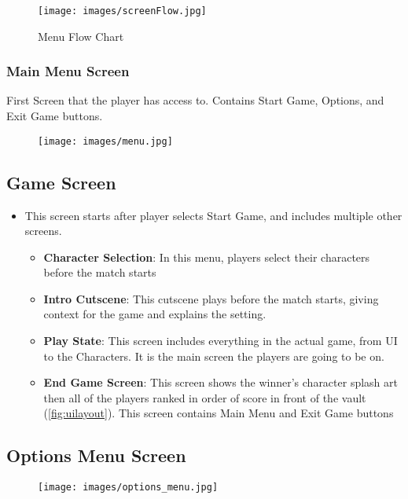 \documentclass[10pt]{report}
\begin{document}
\begin{figure}[H]
    \centering
    \texttt{[image: images/screenFlow.jpg]}
    \caption{Menu Flow Chart}
\end{figure}

\subsubsection{Main Menu Screen}

First Screen that the player has access to. Contains Start Game, Options, and Exit Game buttons.

\begin{figure}[H]
    \centering
    \texttt{[image: images/menu.jpg]}
    \caption{}
\end{figure}

\subsection{Game Screen}

\begin{itemize}
    \item This screen starts after player selects Start Game, and includes multiple other screens.
    \begin{itemize}    
        \item \textbf{Character Selection}: In this menu, players select their characters before the match starts
        \item \textbf{Intro Cutscene}: This cutscene plays before the match starts, giving context for the game and explains the setting.
        \item \textbf{Play State}: This screen includes everything in the actual game, from UI to the Characters. It is the main screen the players are going to be on.
        \item \textbf{End Game Screen}: This screen shows the winner’s character splash art then all of the players ranked in order of score in front of the vault (\ref{fig:uilayout}). This screen contains Main Menu and Exit Game buttons
    \end{itemize}
\end{itemize}

\subsection{Options Menu Screen}

\begin{figure}[H]
    \centering
    \texttt{[image: images/options\_menu.jpg]}
\end{figure}
\end{document}
